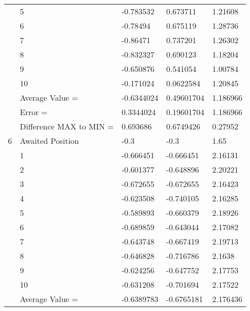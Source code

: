\begin{tabular}{|p{2cm}|p{3cm}|p{3cm}|p{3cm}|p{3cm}|}
             & 5                       & -0.783532    & 0.673711     & 1.21608    \\
             & 6                       & -0.78494     & 0.675119     & 1.28736    \\
             & 7                       & -0.86471     & 0.737201     & 1.26302    \\
             & 8                       & -0.832327    & 0.690123     & 1.18204    \\
             & 9                       & -0.650876    & 0.541054     & 1.00784    \\
             & 10                      & -0.171024    & 0.0622584    & 1.20845    \\
             & Average Value =         & -0.6344024   & 0.49601704   & 1.186966   \\
             & Error =                 & 0.3344024    & 0.19601704   & 1.186966   \\
             & Difference MAX to MIN = & 0.693686     & 0.6749426    & 0.27952    \\
\hline
6            & Awaited Position        & -0.3         & -0.3         & 1.65       \\
             & 1                       & -0.666451    & -0.666451    & 2.16131    \\
             & 2                       & -0.601377    & -0.648896    & 2.20221    \\
             & 3                       & -0.672655    & -0.672655    & 2.16423    \\
             & 4                       & -0.623508    & -0.740105    & 2.16285    \\
             & 5                       & -0.589893    & -0.660379    & 2.18926    \\
             & 6                       & -0.689859    & -0.643044    & 2.17082    \\
             & 7                       & -0.643748    & -0.667419    & 2.19713    \\
             & 8                       & -0.646828    & -0.716786    & 2.1638     \\
             & 9                       & -0.624256    & -0.647752    & 2.17753    \\
             & 10                      & -0.631208    & -0.701694    & 2.17522    \\
             & Average Value =         & -0.6389783   & -0.6765181   & 2.176436   \\

\end{tabular}
